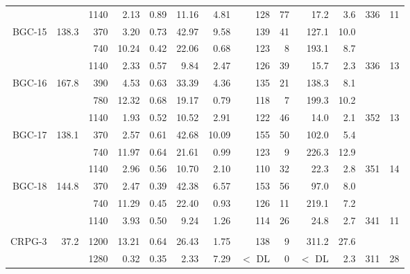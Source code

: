 \documentclass[authoryear,review,12pt]{elsarticle}
\begin{document}
\begin{table}
\begin{tabular}{|r|rrrrrrrrrrrr|}
          &       & 1140  & 2.13  & 0.89  & 11.16 & 4.81  & 128   & 77    & 17.2  & 3.6   & 336   & 11 \\
    BGC-15 & 138.3 & 370   & 3.20  & 0.73  & 42.97 & 9.58  & 139   & 41    & 127.1 & 10.0  &       &  \\
          &       & 740   & 10.24 & 0.42  & 22.06 & 0.68  & 123   & 8     & 193.1 & 8.7   &       &  \\
          &       & 1140  & 2.33  & 0.57  & 9.84  & 2.47  & 126   & 39    & 15.7  & 2.3   & 336   & 13 \\
    BGC-16 & 167.8 & 390   & 4.53  & 0.63  & 33.39 & 4.36  & 135   & 21    & 138.3 & 8.1   &       &  \\
          &       & 780   & 12.32 & 0.68  & 19.17 & 0.79  & 118   & 7     & 199.3 & 10.2  &       &  \\
          &       & 1140  & 1.93  & 0.52  & 10.52 & 2.91  & 122   & 46    & 14.0  & 2.1   & 352   & 13 \\
    BGC-17 & 138.1 & 370   & 2.57  & 0.61  & 42.68 & 10.09 & 155   & 50    & 102.0 & 5.4   &       &  \\
          &       & 740   & 11.97 & 0.64  & 21.61 & 0.99  & 123   & 9     & 226.3 & 12.9  &       &  \\
          &       & 1140  & 2.96  & 0.56  & 10.70 & 2.10  & 110   & 32    & 22.3  & 2.8   & 351   & 14 \\
    BGC-18 & 144.8 & 370   & 2.47  & 0.39  & 42.38 & 6.57  & 153   & 56    & 97.0  & 8.0   &       &  \\
          &       & 740   & 11.29 & 0.45  & 22.40 & 0.93  & 126   & 11    & 219.1 & 7.2   &       &  \\
          &       & 1140  & 3.93  & 0.50  & 9.24  & 1.26  & 114   & 26    & 24.8  & 2.7   & 341   & 11 \\
          &       &       &       &       &       &       &       &       &       &       &       &  \\
    CRPG-3 & 37.2  & 1200  & 13.21 & 0.64  & 26.43 & 1.75  & 138   & 9     & 311.2 & 27.6  &       &  \\
          &       & 1280  & 0.32  & 0.35  & 2.33  & 7.29  & $<$ DL  & 0     & $<$ DL  & 2.3   & 311   & 28 \\

    \hline
    \end{tabular}
\end{table}

%
%
\end{document}
